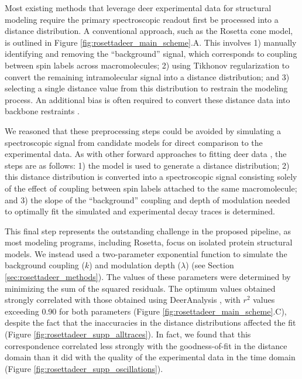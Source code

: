 Most existing methods that leverage \gls{deer} experimental data for structural modeling require the primary spectroscopic readout first be processed into a distance distribution. A conventional approach, such as the Rosetta \gls{cone} model, is outlined in Figure \ref{fig:rosettadeer_main_scheme}.A. This involves 1) manually identifying and removing the “background” signal, which corresponds to coupling between spin labels across macromolecules; 2) using Tikhonov regularization to convert the remaining intramolecular signal into a distance distribution; and 3) selecting a single distance value from this distribution to restrain the modeling process. An additional bias is often required to convert these distance data into backbone restraints \citep*{Alexander2008, Alexander2013, Sale2004, Yang2010}.

We reasoned that these preprocessing steps could be avoided by simulating a spectroscopic signal from candidate models for direct comparison to the experimental data. As with other forward approaches to fitting \gls{deer} data \citep*{Hustedt2018, Stein2015}, the steps are as follows: 1) the model is used to generate a distance distribution; 2) this distance distribution is converted into a spectroscopic signal consisting solely of the effect of coupling between spin labels attached to the same macromolecule; and 3) the slope of the “background” coupling and depth of modulation needed to optimally fit the simulated and experimental decay traces is determined.

This final step represents the outstanding challenge in the proposed pipeline, as most modeling programs, including Rosetta, focus on isolated protein structural models. We instead used a two-parameter exponential function to simulate the background coupling ($k$) and modulation depth ($\lambda$) (see Section \ref{sec:rosettadeer_methods}). The values of these parameters were determined by minimizing the sum of the squared residuals. The optimum values obtained strongly correlated with those obtained using DeerAnalysis \citep*{Jeschke2006}, with $r^2$ values exceeding 0.90 for both parameters (Figure \ref{fig:rosettadeer_main_scheme}.C), despite the fact that the inaccuracies in the distance distributions affected the fit (Figure \ref{fig:rosettadeer_supp_alltraces}). In fact, we found that this correspondence correlated less strongly with the goodness-of-fit in the distance domain than it did with the quality of the experimental data in the time domain (Figure \ref{fig:rosettadeer_supp_oscillations}).

